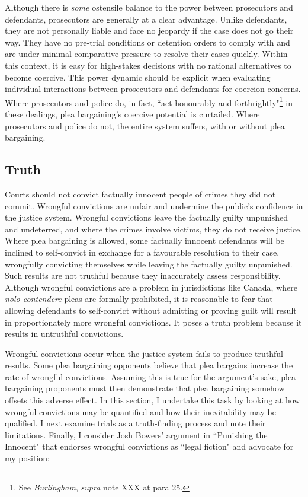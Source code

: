 Although there is \textit{some} ostensile balance to the power between prosecutors and defendants, prosecutors are generally at a clear advantage. Unlike defendants, they are not personally liable and face no jeopardy if the case does not go their way. They have no pre-trial conditions or detention orders to comply with and are under minimal comparative pressure to resolve their cases quickly. Within this context, it is easy for high-stakes decisions with no rational alternatives to become coercive. This power dynamic should be explicit when evaluating individual interactions between prosecutors and defendants for coercion concerns. Where prosecutors and police do, in fact, ``act honourably and forthrightly"\footnote{See \textit{Burlingham}, \textit{supra} note XXX at para 25.} in these dealings, plea bargaining's coercive potential is curtailed. Where prosecutors and police do not, the entire system suffers, with or without plea bargaining.

\subsection{Truth}

Courts should not convict factually innocent people of crimes they did not commit. Wrongful convictions are unfair and undermine the public's confidence in the justice system. Wrongful convictions leave the factually guilty unpunished and undeterred, and where the crimes involve victims, they do not receive justice. Where plea bargaining is allowed, some factually innocent defendants will be inclined to self-convict in exchange for a favourable resolution to their case, wrongfully convicting themselves while leaving the factually guilty unpunished. Such results are not truthful because they inaccurately assess responsibility. Although wrongful convictions are a problem in jurisdictions like Canada, where \textit{nolo contendere} pleas are formally prohibited, it is reasonable to fear that allowing defendants to self-convict without admitting or proving guilt will result in proportionately more wrongful convictions. It poses a truth problem because it results in untruthful convictions.

Wrongful convictions occur when the justice system fails to produce truthful results. Some plea bargaining opponents believe that plea bargains increase the rate of wrongful convictions. Assuming this is true for the argument's sake, plea bargaining proponents must then demonstrate that plea bargaining somehow offsets this adverse effect. In this section, I undertake this task by looking at how wrongful convictions may be quantified and how their inevitability may be qualified. I next examine trials as a truth-finding process and note their limitations. Finally, I consider Josh Bowers' argument in ``Punishing the Innocent" that endorses wrongful convictions as ``legal fiction" and advocate for my position:

